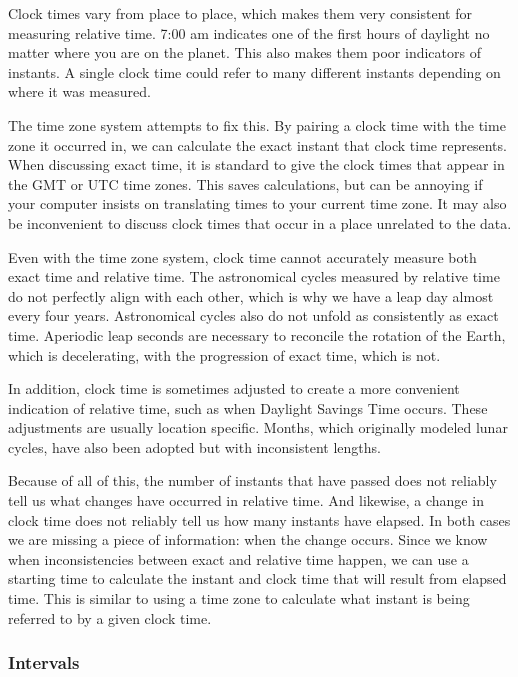 \documentclass[article]{jss}
\begin{document}
Clock times vary from place to place, which makes them very consistent for measuring relative time.  7:00 am indicates one of the first hours of daylight no matter where you are on the planet. This also makes them poor indicators of instants. A single clock time could refer to many different instants depending on where it was measured.

The time zone system attempts to fix this.  By pairing a clock time with the time zone it occurred in, we can calculate the exact instant that clock time represents. When discussing exact time, it is standard to give the clock times that appear in the GMT or UTC time zones.  This saves calculations, but can be annoying if your computer insists on translating times to your current time zone.  It may also be inconvenient to discuss clock times that occur in a place unrelated to the data.

Even with the time zone system, clock time cannot accurately measure both exact time and relative time. The astronomical cycles measured by relative time do not perfectly align with each other, which is why we have a leap day almost every four years. Astronomical cycles also do not unfold as consistently as exact time. Aperiodic leap seconds are necessary to reconcile the rotation of the Earth, which is decelerating, with the progression of exact time, which is not.

In addition, clock time is sometimes adjusted to create a more convenient indication of relative time, such as when Daylight Savings Time occurs.  These adjustments are usually location specific. Months, which originally modeled lunar cycles, have also been adopted but with inconsistent lengths.

Because of all of this, the number of instants that have passed does not reliably tell us what changes have occurred in relative time. And likewise, a change in clock time does not reliably tell us how many instants have elapsed. In both cases we are missing a piece of information: when the change occurs. Since we know when inconsistencies between exact and relative time happen, we can use a starting time to calculate the instant and clock time that will result from elapsed time. This is similar to using a time zone to calculate what instant is being referred to by a given clock time.

\subsubsection{Intervals}
\end{document}

